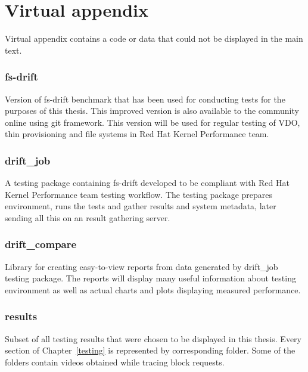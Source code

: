\documentclass[
  color, %
  table, %
  lof,   %
  lot,   %
]{fithesis3}
\begin{document}
\clearpage
\chapter{Virtual appendix}
\label{virtual}
Virtual appendix contains a code or data that could not be displayed in the main text.

\subsection{fs-drift}
Version of fs-drift benchmark that has been used for conducting tests for the purposes of this thesis. This improved version is also available to the community online using git framework. This version will be used for regular testing of VDO, thin provisioning and file systems in Red Hat Kernel Performance team.

\subsection{drift\_job}
A testing package containing fs-drift developed to be compliant with Red Hat Kernel Performance team testing workflow. The testing package prepares environment, runs the tests and gather results and system metadata, later sending all this on an result gathering server. 

\subsection{drift\_compare}
Library for creating easy-to-view reports from data generated by drift\_job testing package. The reports will display many useful information about testing environment as well as actual charts and plots displaying measured performance.

\subsection{results}
Subset of all testing results that were chosen to be displayed in this thesis. Every section of Chapter~\ref{testing} is represented by corresponding folder. Some of the folders contain videos obtained while tracing block requests.
\end{document}
